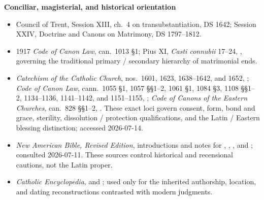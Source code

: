 \textbf{Conciliar, magisterial, and historical orientation}
{\fontsize{8.3}{9.2}\selectfont
\begin{itemize}[itemsep=0em,topsep=0.15em,parsep=0pt]
\item Council of Trent, Session XIII, ch.~4 on transubstantiation, DS 1642; Session XXIV, Doctrine and Canons on Matrimony, DS 1797--1812.
\item 1917 \emph{Code of Canon Law}, can.~1013 \S1; Pius XI, \emph{Casti connubii} 17--24, , governing the traditional primary / secondary hierarchy of matrimonial ends.
\item \emph{Catechism of the Catholic Church}, nos.~1601, 1623, 1638--1642, and 1652, ; \emph{Code of Canon Law}, cann.~1055 \S1, 1057 \S\S1--2, 1061 \S1, 1084 \S3, 1108 \S\S1--2, 1134--1136, 1141--1142, and 1151--1155, ; \emph{Code of Canons of the Eastern Churches}, can.~828 \S\S1--2, . These exact loci govern consent, form, bond and grace, sterility, dissolution / protection qualifications, and the Latin / Eastern blessing distinction; accessed 2026-07-14.
\item \emph{New American Bible, Revised Edition}, introductions and notes for , , , and ; consulted 2026-07-11. These sources control historical and recensional cautions, not the Latin proper.
\item \emph{Catholic Encyclopedia},  and ; used only for the inherited authorship, location, and dating reconstructions contrasted with modern judgments.
\end{itemize}
}

\begingroup
\enlargethispage{3\baselineskip}
\setlength{\parskip}{0pt}
